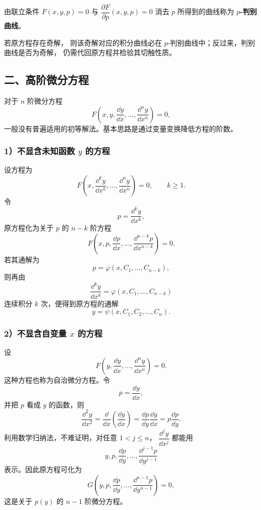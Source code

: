 \begin{definition}\label{def:p判别曲线}
	由联立条件
	$F(x,y,p)=0$ 与 $\dfrac{\partial F}{\partial p}(x,y,p)=0$
	消去 $p$ 所得到的曲线称为
	\textbf{$p$-判别曲线}。
\end{definition}

若原方程存在奇解，
则该奇解对应的积分曲线必在 $p$-判别曲线中；反过来，判别曲线是否为奇解，
仍需代回原方程并检验其切触性质。

\subsection*{二、高阶微分方程}

对于 $n$ 阶微分方程
\[
	F\left(
		x,y,\dfrac{\dd y}{\dd x},\ldots,
		\dfrac{\dd^n y}{\dd x^n}
	\right)=0,
\]
一般没有普遍适用的初等解法。基本思路是通过变量变换降低方程的阶数。

\subsubsection*{1）不显含未知函数 \(y\) 的方程}

设方程为
\[
	F\left(
		x,\dfrac{\dd^k y}{\dd x^k},\ldots,
		\dfrac{\dd^n y}{\dd x^n}
	\right)=0,
	\qquad k\geqslant 1.
\]
令
\[
	p=\dfrac{\dd^k y}{\dd x^k},
\]
原方程化为关于 $p$ 的 $n-k$ 阶方程
\[
	F\left(
		x,p,\dfrac{\dd p}{\dd x},\ldots,
		\dfrac{\dd^{n-k}p}{\dd x^{n-k}}
	\right)=0.
\]
若其通解为
\[
	p=\varphi(x,C_1,\ldots,C_{n-k}),
\]
则再由
\[
	\dfrac{\dd^k y}{\dd x^k}
	=\varphi(x,C_1,\ldots,C_{n-k})
\]
连续积分 $k$ 次，便得到原方程的通解
\[
	y=\psi(x,C_1,C_2,\ldots,C_n).
\]

\subsubsection*{2）不显含自变量 \(x\) 的方程}

设
\[
	F\left(
		y,\dfrac{\dd y}{\dd x},\ldots,
		\dfrac{\dd^n y}{\dd x^n}
	\right)=0.
\]
这种方程也称为自治微分方程。令
\[
	p=\dfrac{\dd y}{\dd x},
\]
并把 $p$ 看成 $y$ 的函数，则
\[
	\dfrac{\dd^2 y}{\dd x^2}
	=\dfrac{\dd}{\dd x}\left(\dfrac{\dd y}{\dd x}\right)
	=\dfrac{\dd p}{\dd y}\dfrac{\dd y}{\dd x}
	=p\dfrac{\dd p}{\dd y}.
\]
利用数学归纳法，不难证明，对任意 $1<j\leqslant n$，
$\dfrac{\dd^j y }{\dd x^j}$ 都能用
\[
	y, p, \dfrac{\dd p}{\dd y},\ldots,
	\dfrac{\dd^{j-1}p}{\dd y^{j-1}}
\]
表示。因此原方程可化为
\[
	G\left(
		y,p,\dfrac{\dd p}{\dd y},\ldots,
		\dfrac{\dd^{n-1}p}{\dd y^{n-1}}
	\right)=0,
\]
这是关于 $p(y)$ 的 $n-1$ 阶微分方程。

